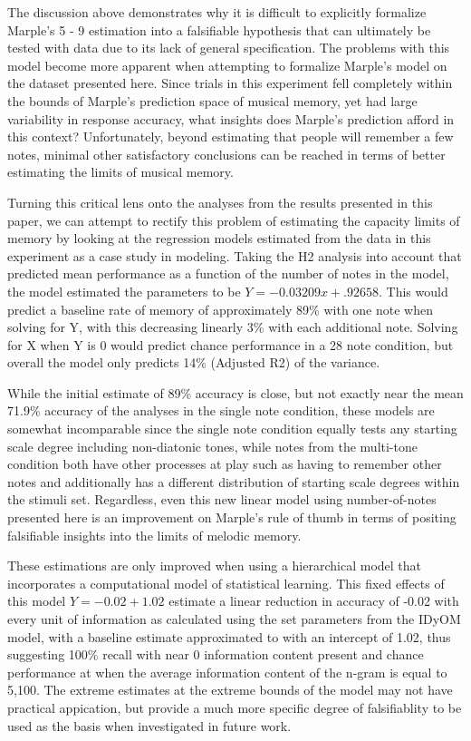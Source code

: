 \documentclass[english,man,floatsintext]{apa6}
\begin{document}
The discussion above demonstrates why it is difficult to explicitly formalize Marple's 5 - 9 estimation into a falsifiable hypothesis that can ultimately be tested with data due to its lack of general specification.
The problems with this model become more apparent when attempting to formalize Marple's model on the dataset presented here.
Since trials in this experiment fell completely within the bounds of Marple's prediction space of musical memory, yet had large variability in response accuracy, what insights does Marple's prediction afford in this context?
Unfortunately, beyond estimating that people will remember a few notes, minimal other satisfactory conclusions can be reached in terms of better estimating the limits of musical memory.

Turning this critical lens onto the analyses from the results presented in this paper, we can attempt to rectify this problem of estimating the capacity limits of memory by looking at the regression models estimated from the data in this experiment as a case study in modeling.
Taking the H2 analysis into account that predicted mean performance as a function of the number of notes in the model, the model estimated the parameters to be \(Y = -0.03209x + .92658\).
This would predict a baseline rate of memory of approximately 89\% with one note when solving for Y, with this decreasing linearly 3\% with each additional note. Solving for X when Y is 0 would predict chance performance in a 28 note condition, but overall the model only predicts 14\% (Adjusted R2) of the variance.

While the initial estimate of 89\% accuracy is close, but not exactly near the mean 71.9\% accuracy of the analyses in the single note condition, these models are somewhat incomparable since the single note condition equally tests any starting scale degree including non-diatonic tones, while notes from the multi-tone condition both have other processes at play such as having to remember other notes and additionally has a different distribution of starting scale degrees within the stimuli set.
Regardless, even this new linear model using number-of-notes presented here is an improvement on Marple's rule of thumb in terms of positing falsifiable insights into the limits of melodic memory.

These estimations are only improved when using a hierarchical model that incorporates a computational model of statistical learning.
This fixed effects of this model \(Y = -0.02 + 1.02\) estimate a linear reduction in accuracy of -0.02 with every unit of information as calculated using the set parameters from the IDyOM model, with a baseline estimate approximated to with an intercept of 1.02, thus suggesting 100\% recall with near 0 information content present and chance performance at when the average information content of the n-gram is equal to 5,100.
The extreme estimates at the extreme bounds of the model may not have practical appication, but provide a much more specific degree of falsifiablity to be used as the basis when investigated in future work.
\end{document}
